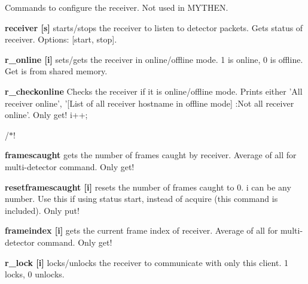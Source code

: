 Commands to configure the receiver. Not used in MYTHEN.


\begin{DoxyItemize}
\item {\bfseries receiver \mbox{[}s\mbox{]}} starts/stops the receiver to listen to detector packets. Gets status of receiver. Options: \mbox{[}start, stop\mbox{]}.
\end{DoxyItemize}


\begin{DoxyItemize}
\item {\bfseries r\_\-online \mbox{[}i\mbox{]}} sets/gets the receiver in online/offline mode. 1 is online, 0 is offline. Get is from shared memory.
\end{DoxyItemize}


\begin{DoxyItemize}
\item {\bfseries r\_\-checkonline} Checks the receiver if it is online/offline mode. Prints either 'All receiver online', '\mbox{[}List of all receiver hostname in offline mode\mbox{]} :Not all receiver online'. Only get! i++;
\end{DoxyItemize}

/$\ast$!


\begin{DoxyItemize}
\item {\bfseries framescaught} gets the number of frames caught by receiver. Average of all for multi-\/detector command. Only get!
\end{DoxyItemize}


\begin{DoxyItemize}
\item {\bfseries resetframescaught \mbox{[}i\mbox{]}} resets the number of frames caught to 0. i can be any number. Use this if using status start, instead of acquire (this command is included). Only put!
\end{DoxyItemize}


\begin{DoxyItemize}
\item {\bfseries frameindex \mbox{[}i\mbox{]}} gets the current frame index of receiver. Average of all for multi-\/detector command. Only get!
\end{DoxyItemize}


\begin{DoxyItemize}
\item {\bfseries r\_\-lock \mbox{[}i\mbox{]}} locks/unlocks the receiver to communicate with only this client. 1 locks, 0 unlocks.
\end{DoxyItemize}


